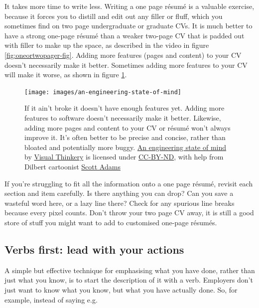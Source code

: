 \documentclass[
]{book}
\begin{document}
It takes more time to write less. Writing a one page résumé is a valuable exercise, because it forces you to distill and edit out any filler or fluff, which you sometimes find on two page undergraduate or graduate CVs. It is much better to have a strong one-page résumé than a weaker two-page CV that is padded out with filler to make up the space, as described in the video in figure \ref{fig:oneortwopager-fig}. Adding more features (pages and content) to your CV doesn't necessarily make it better. Sometimes adding more features to your CV will make it worse, as shown in figure \ref{fig:morefeatures-fig}.

\begin{figure}

{\centering \texttt{[image: images/an-engineering-state-of-mind]} 

}

\caption{If it ain't broke it doesn't have enough features yet. Adding more features to software doesn't necessarily make it better. Likewise, adding more pages and content to your CV or résumé won't always improve it. It's often better to be precise and concise, rather than bloated and potentially more buggy. \href{https://bryanmmathers.com/an-engineering-state-of-mind/}{An engineering state of mind} by \href{https://visualthinkery.com/}{Visual Thinkery} is licensed under \href{https://creativecommons.org/licenses/by-nd/4.0/}{CC-BY-ND}, with help from Dilbert cartoonist \href{https://en.wikipedia.org/wiki/Scott_Adams}{Scott Adams}}\label{fig:morefeatures-fig}
\end{figure}



If you're struggling to fit all the information onto a one page résumé, revisit each section and item carefully. Is there anything you can drop? Can you save a wasteful word here, or a lazy line there? Check for any spurious line breaks because every pixel counts. Don't throw your two page CV away, it is still a good store of stuff you might want to add to customised one-page résumés.

\hypertarget{verbsfirst}{%
\subsection{Verbs first: lead with your actions}\label{verbsfirst}}

A simple but effective technique for emphasising what you have done, rather than just what you know, is to start the description of it with a verb. Employers don't just want to know what you know, but what you have actually done. So, for example, instead of saying e.g.
\end{document}
